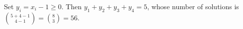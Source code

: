 Set $y_i=x_i-1\ge0$. Then $y_1+y_2+y_3+y_4=5$, whose number of solutions is $\binom{5+4-1}{4-1}=\binom83=\boxed{56}$.
